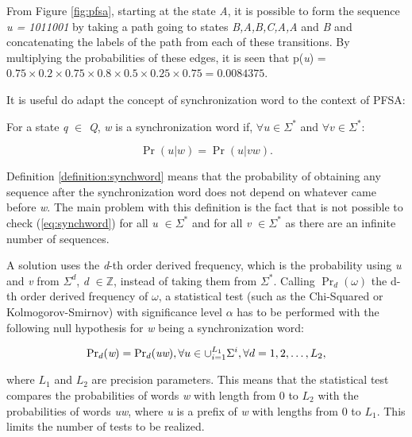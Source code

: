 {From Figure \ref{fig:pfsa}, starting at the state \textit{A}, it is possible to form the sequence \textit{u = 1011001} by taking a path going to states \textit{B,A,B,C,A,A} and \textit{B} and concatenating the labels of the path from each of these transitions. By multiplying the probabilities of these edges, it is seen that p(\textit{u}) = $0.75\times0.2\times0.75\times0.8\times0.5\times0.25\times0.75 = 0.0084375$.

It is useful do adapt the concept of synchronization word to the context of PFSA:

\begin{definition}\label{definition:synchword}
For a state \textit{q} $\in$ \textit{Q}, \textit{w} is a synchronization word if, $\forall \textit{u} \in \Sigma^*$ and $\forall \textit{v} \in \Sigma^*$:

\begin{equation}
\Pr(\textit{u}|\textit{w}) = \Pr(\textit{u}|\textit{vw}).
\label{eq:synchword}
\end{equation}
\end{definition}

Definition \ref{definition:synchword} means that the probability of obtaining any sequence after the synchronization word does not depend on whatever came before \textit{w}. The main problem with this definition is the fact that is not possible to check (\ref{eq:synchword}) for all \textit{u} $\in \Sigma^*$ and for all \textit{v} $\in \Sigma^*$ as there are an infinite number of sequences.

  A solution uses the \textit{d}-th order derived frequency, which is the probability using \textit{u} and \textit{v} from $\Sigma^d$, \textit{d} $\in \mathbb{Z}$, instead of taking them from $\Sigma^*$. Calling $\Pr_d(\omega)$ the d-th order derived frequency of $\omega$, a statistical test (such as the Chi-Squared or Kolmogorov-Smirnov) with significance level $\alpha$ has to be performed with the following null hypothesis for \textit{w} being a synchronization word:

\begin{equation}
\textnormal{Pr}_{d}(\textit{w}) = \textnormal{Pr}_{d}(\textit{uw}), \forall u \in \cup_{i=1}^{L_1}\Sigma^i, \forall d = 1,2,\ldots,L_2,  
\label{eq:practsynchword}
\end{equation}

where $L_1$ and $L_2$ are precision parameters. This means that the statistical test compares the probabilities of words \textit{w} with length from 0 to \textit{$L_2$} with the probabilities of words \textit{uw}, where \textit{u} is a prefix of \textit{w} with lengths from 0 to \textit{$L_1$}. This limits the number of tests to be realized.

}
